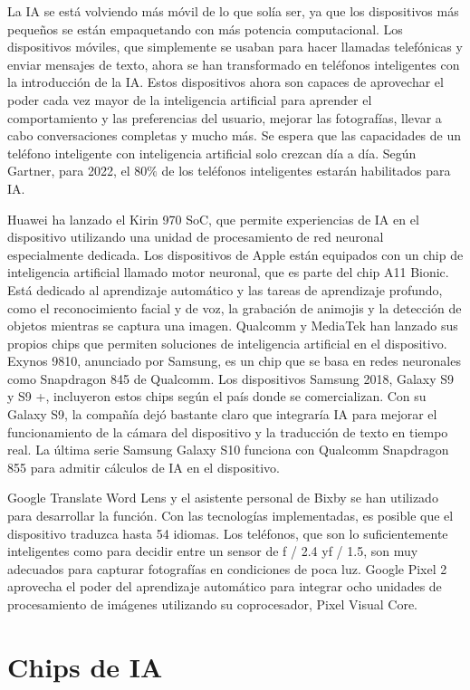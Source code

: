La IA se está volviendo más móvil de lo que solía ser, ya que los dispositivos más 
pequeños se están empaquetando con más potencia computacional. Los dispositivos móviles, que simplemente se usaban para hacer llamadas telefónicas y enviar mensajes de texto, ahora se han transformado en teléfonos inteligentes con la introducción de la IA. Estos dispositivos ahora son capaces de aprovechar el poder cada vez mayor de la inteligencia artificial para aprender el comportamiento y las preferencias del usuario, mejorar las fotografías, llevar a cabo conversaciones completas y mucho más. Se espera que las capacidades de un teléfono inteligente con inteligencia artificial solo crezcan día a día. Según Gartner, para 2022, el $80\%$ de los teléfonos inteligentes estarán habilitados para IA.

Huawei ha lanzado el Kirin 970 SoC, que permite experiencias de IA en el dispositivo utilizando una unidad de procesamiento de red neuronal especialmente dedicada. Los dispositivos de Apple están equipados con un chip de inteligencia artificial llamado motor neuronal, que es parte del chip A11 Bionic. Está dedicado al aprendizaje automático y las tareas de aprendizaje profundo, como el reconocimiento facial y de voz, la grabación de animojis y la detección de objetos mientras se captura una imagen. Qualcomm y MediaTek han lanzado sus propios chips que permiten soluciones de inteligencia artificial en el dispositivo. Exynos 9810, anunciado por Samsung, es un chip que se basa en redes neuronales como Snapdragon 845 de Qualcomm. Los dispositivos Samsung 2018, Galaxy S9 y S9 +, incluyeron estos chips según el país donde se comercializan. Con su Galaxy S9, la compañía dejó bastante claro que integraría IA para mejorar el funcionamiento de la cámara del dispositivo y la traducción de texto en tiempo real. La última serie Samsung Galaxy S10 funciona con Qualcomm Snapdragon 855 para admitir cálculos de IA en el dispositivo.

Google Translate Word Lens y el asistente personal de Bixby se han utilizado para desarrollar la función. Con las tecnologías implementadas, es posible que el dispositivo traduzca hasta 54 idiomas. Los teléfonos, que son lo suficientemente inteligentes como para decidir entre un sensor de f / 2.4 yf / 1.5, son muy adecuados para capturar fotografías en condiciones de poca luz. Google Pixel 2 aprovecha el poder del aprendizaje automático para integrar ocho unidades de procesamiento de imágenes utilizando su coprocesador, Pixel Visual Core.

\section{Chips de IA}

